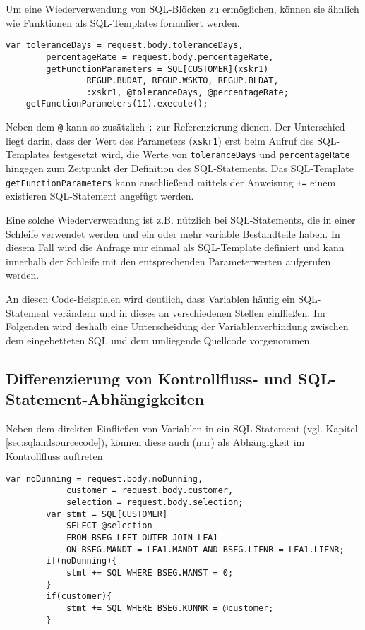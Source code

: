 Um eine Wiederverwendung von SQL-Blöcken zu ermöglichen, können sie ähnlich wie Funktionen als SQL-Templates \cite{Horschig2014} formuliert werden.

	\begin{lstlisting}[caption={SQL-Templates ermöglichen Wiederverwendung}, label={lst:sqlfunctions}, language=JavaScriptSQL]
	var toleranceDays = request.body.toleranceDays,
	    percentageRate = request.body.percentageRate,
	    getFunctionParameters = SQL[CUSTOMER](xskr1)
				REGUP.BUDAT, REGUP.WSKTO, REGUP.BLDAT,
				:xskr1, @toleranceDays, @percentageRate;
	getFunctionParameters(11).execute();
	\end{lstlisting}

Neben dem \texttt{@} kann so zusätzlich \texttt{:} zur Referenzierung dienen.
Der Unterschied liegt darin, dass der Wert des Parameters (\texttt{xskr1}) erst beim Aufruf des SQL-Templates festgesetzt wird, die Werte von \texttt{toleranceDays} und \texttt{percentageRate} hingegen zum Zeitpunkt der Definition des SQL-Statements.
Das SQL-Template \texttt{getFunctionParameters} kann anschließend mittels der Anweisung \texttt{+=} einem existieren SQL-Statement angefügt werden.

Eine solche Wiederverwendung ist z.B. nützlich bei SQL-Statements, die in einer Schleife verwendet werden und ein oder mehr variable Bestandteile haben.
In diesem Fall wird die Anfrage nur einmal als SQL-Template definiert und kann innerhalb der Schleife mit den entsprechenden Parameterwerten aufgerufen werden.

An diesen Code-Beispielen wird deutlich, dass Variablen häufig ein SQL-Statement verändern und in dieses an verschiedenen Stellen einfließen.
Im Folgenden wird deshalb eine Unterscheidung der Variablenverbindung zwischen dem eingebetteten SQL und dem umliegende Quellcode vorgenommen.

\subsection{Differenzierung von Kontrollfluss- und SQL-Statement-Abhängigkeiten}\label{sec:controlflowandsqldependencies}
Neben dem direkten Einfließen von Variablen in ein SQL-Statement (vgl. Kapitel \ref{sec:sqlandsourcecode}), können diese auch (nur) als Abhängigkeit im Kontrollfluss auftreten.

	\begin{lstlisting}[caption={Verschiedene Arten der Abhängigkeit von Variablen}, label={lst:differentdep}, language=JavaScriptSQL]
		var noDunning = request.body.noDunning,
		    customer = request.body.customer,
		    selection = request.body.selection;
		var stmt = SQL[CUSTOMER]
			SELECT @selection
			FROM BSEG LEFT OUTER JOIN LFA1
			ON BSEG.MANDT = LFA1.MANDT AND BSEG.LIFNR = LFA1.LIFNR;
		if(noDunning){
			stmt += SQL WHERE BSEG.MANST = 0;
		}
		if(customer){
			stmt += SQL WHERE BSEG.KUNNR = @customer;
		}
	\end{lstlisting}

